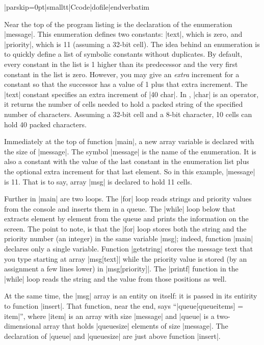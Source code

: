 \bigskip{}
\verbatim|parskip=0pt|smalltt|Ccode|dofile|endverbatim\endlistingx

\noindent{}%
Near the top of the program listing is the declaration of the enumeration
|message|. This enumeration defines two constants: |text|, which is zero, and
|priority|, which is 11 (assuming a 32-bit cell). The idea behind an
enumeration is to quickly define a list of symbolic constants without
duplicates. By default, every constant in the list is 1 higher than its
predecessor and the very first constant in the list is zero. However, you may
give an {\it extra\/} increment for a constant so that the successor has a
value of 1 plus that extra increment. The |text| constant specifies an extra
increment of |40 char|.
%
In \Small, |char| is an operator, it returns the number of cells needed to
hold a packed string of the specified number of characters. Assuming a 32-bit
cell and a 8-bit character, 10 cells can hold 40 packed characters.

Immediately at the top of function |main|, a new array variable is declared
with the size of |message|. The symbol |message| is the name of the enumeration.
It is also a constant with the value of the last constant in the enumeration
list plus the optional extra increment for that last element. So in this
example, |message| is 11. That is to say, array |msg| is declared to hold 11
cells.

Further in |main| are two loops. The |for| loop reads strings and priority
values from the console and inserts them in a queue. The |while| loop below
that extracts element by element from the queue and prints the information on
the screen. The point to note, is that the |for| loop stores both the string
and the priority number (an integer) in the same variable |msg|; indeed,
function |main| declares only a single variable. Function |getstring| stores
the message text that you type starting at array |msg[text]| while the
priority value is stored (by an assignment a few lines lower) in
|msg[priority]|. The |printf| function in the |while| loop reads the string
and the value from those positions as well.

At the same time, the |msg| array is an entity on itself: it is passed in its
entirity to function |insert|. That function, near the end, says
``|queue[queueitems] = item|'', where |item| is an array with size |message|
and |queue| is a two-dimensional array that holds |queuesize| elements of size
|message|. The declaration of |queue| and |queuesize| are just above function
|insert|.

